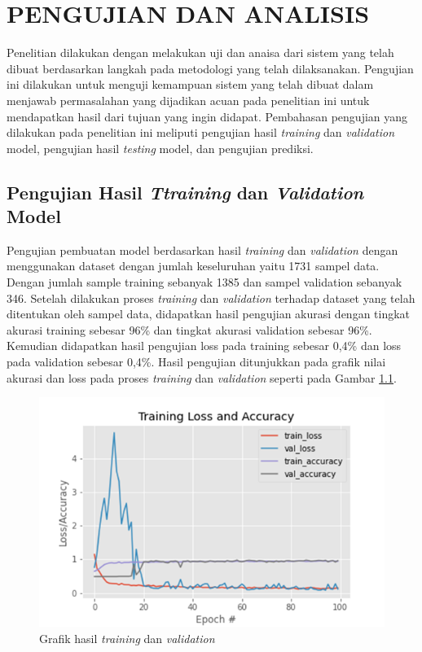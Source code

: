 \chapter{PENGUJIAN DAN ANALISIS}
\label{chap:pengujiananalisis}


Penelitian dilakukan dengan melakukan uji dan anaisa dari sistem yang telah dibuat berdasarkan langkah pada metodologi yang telah dilaksanakan. Pengujian ini dilakukan untuk menguji kemampuan sistem yang telah dibuat dalam menjawab permasalahan yang dijadikan acuan pada penelitian ini untuk mendapatkan hasil dari tujuan yang ingin didapat. Pembahasan pengujian yang dilakukan pada penelitian ini meliputi pengujian hasil \emph{training} dan \emph{validation} model, pengujian hasil \emph{testing} model, dan pengujian prediksi.

\section{Pengujian Hasil \emph{Ttraining} dan \emph{Validation} Model}
\label{sec:PengujianTrainingValidation}

Pengujian pembuatan model berdasarkan hasil \emph{training} dan \emph{validation} dengan menggunakan dataset dengan jumlah keseluruhan yaitu 1731 sampel data. Dengan jumlah sample training sebanyak 1385 dan sampel validation sebanyak 346. Setelah dilakukan proses \emph{training} dan \emph{validation} terhadap dataset yang telah ditentukan oleh sampel data, didapatkan hasil pengujian akurasi dengan tingkat akurasi training sebesar 96\% dan tingkat akurasi validation sebesar 96\%. Kemudian didapatkan hasil pengujian loss pada training sebesar 0,4\% dan loss pada validation sebesar 0,4\%. Hasil pengujian ditunjukkan pada grafik nilai akurasi dan loss pada proses \emph{training} dan \emph{validation} seperti pada Gambar \ref{fig:HasilTrainingValidation}.

\begin{figure}[H]
  \centering
  \includegraphics[scale=0.85]{gambar/hasil training dan validation.png}
  \caption{Grafik hasil \emph{training} dan \emph{validation}}
  \label{fig:HasilTrainingValidation}
\end{figure}


